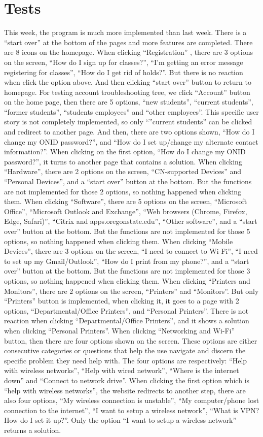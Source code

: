\documentclass[12pt, letterpaper]{article}
\begin{document}
	\section{Tests}
This week, the program is much more implemented than last week. There is a “start over” at the bottom of the pages and more features are completed. 
There are 8 icons on the homepage. 
When clicking “Registration” , there are 3 options on the screen, “How do I sign up for classes?”, “I'm getting an error message registering for classes”, “How do I get rid of holds?”. But there is no reaction when click the option above. And then clicking “start over” button to return to homepage.
For testing account troubleshooting tree, we click “Account” button on the home page, then there are 5 options, “new students”, “current students”, “former students”, “students employees” and “other employees”.  This specific user story is not completely implemented, so only “”current students” can be clicked and redirect to another page. And then, there are two options shown, “How do I change my ONID password?”, and “How do I set up/change my alternate contact information?”.  When clicking on the first option, “How do I change my ONID password?”, it turns to another page that contains a solution.
When clicking “Hardware”, there are 2 options on the screen, “CN-supported Devices” and “Personal Devices”, and a “start over” button at the bottom. But the functions are not implemented for those 2 options, so nothing happened when clicking them.
When clicking “Software”, there are 5 options on the screen, “Microsoft Office”, “Microsoft Outlook and Exchange”, “Web browsers (Chrome, Firefox, Edge, Safari)”, “Citrix and apps.oregonstate.edu”, “Other software”, and a “start over” button at the bottom. But the functions are not implemented for those 5 options, so nothing happened when clicking them. 
When clicking “Mobile Devices”, there are 3 options on the screen, “I need to connect to Wi-Fi”, “I need to set up my Gmail/Outlook”, “How do I print from my phone?”, and a “start over” button at the bottom. But the functions are not implemented for those 3 options, so nothing happened when clicking them. 
When clicking “Printers and Monitors”, there are 2 options on the screen, “Printers” and “Monitors”. But only “Printers” button is implemented, when clicking it, it goes to a page with 2 options, “Departmental/Office Printers”, and “Personal Printers”. There is not reaction when clicking “Departmental/Office Printers”, and it shows a solution when clicking “Personal Printers”.
When clicking “Networking and Wi-Fi” button, then there are four options shown on the screen. These options are either consecutive categories or questions that help the use navigate and discern the specific problem they need help with.  The four options are respectively: “Help with wireless networks”, “Help with wired network”, “Where is the internet down” and “Connect to network drive”. When clicking the first option which is “help with wireless networks”, the website redirects to another step, there are also four options, “My wireless connection is unstable”, “My computer/phone lost connection to the internet”, “I want to setup a wireless network”, “What is VPN? How do I set it up?”. Only the option “I want to setup a wireless network” returns a solution.
\end{document}
